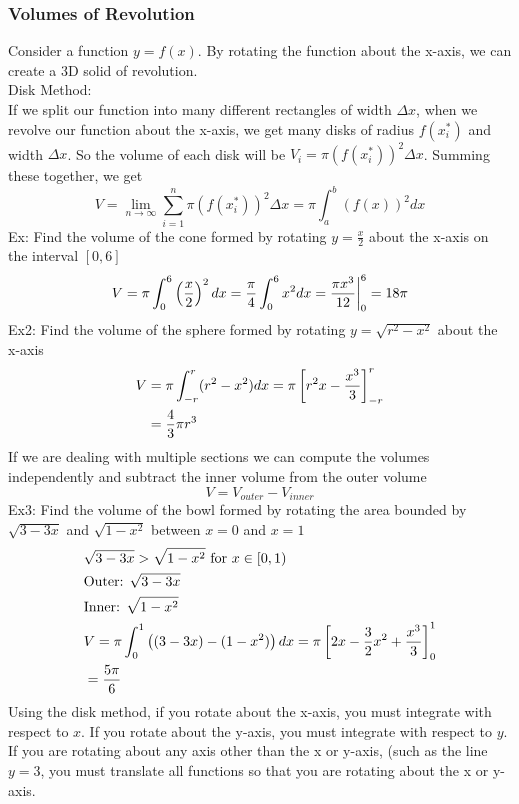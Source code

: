 \documentclass[11pt, fleqn]{article}
\begin{document}
\subsubsection{Volumes of Revolution}
Consider a function $y=f(x)$. By rotating the function about the x-axis, we can create a 3D solid of revolution.\\
Disk Method:\\
If we split our function into many different rectangles of width $\Delta x$, when we revolve our function about the x-axis, we get many disks of radius $f(x_i^*)$ and width $\Delta x$. So the volume of each disk will be $V_i=\pi (f(x_i^*))^2\Delta x$. Summing these together, we get
$$V=\lim_{n\to \infty}\sum_{i=1}^n\pi(f(x_i^*))^2\Delta x=\pi\int_a^b(f(x))^2dx$$
Ex: Find the volume of the cone formed by rotating $y=\frac{x}{2}$ about the x-axis on the interval $[0,6]$
\begin{align*}
    V=\pi\int_0^6\left( \frac{x}{2} \right)^2dx=\frac{\pi}{4}\int_0^6x^2dx={\frac{\pi x^3}{12}}\bigg\vert_0^6=18\pi
\end{align*}
Ex2: Find the volume of the sphere formed by rotating $y=\sqrt{r^2-x^2}$ about the x-axis
\begin{align*}
    V&=\pi\int_{-r}^r(r^2-x^2)dx=\pi\left[ r^2x-\frac{x^3}{3} \right]_{-r}^r\\
    &=\frac{4}{3}\pi r^3
\end{align*}
If we are dealing with multiple sections we can compute the volumes independently and subtract the inner volume from the outer volume
$$V=V_{outer}-V_{inner}$$
Ex3: Find the volume of the bowl formed by rotating the area bounded by $\sqrt{3-3x}$ and $\sqrt{1-x^2}$ between $x=0$ and $x=1$
\begin{align*}
    &\sqrt{3-3x}>\sqrt{1-x^2}\text{ for }x\in[0,1)\\
    &\text{Outer: }\sqrt{3-3x}\\
    &\text{Inner: }\sqrt{1-x^2}\\
    &V=\pi\int_0^1\left( (3-3x)-(1-x^2) \right)dx=\pi\left[ 2x-\frac{3}{2}x^2+\frac{x^3}{3} \right]_0^1\\
    &=\frac{5\pi}{6}
\end{align*}
Using the disk method, if you rotate about the x-axis, you must integrate with respect to $x$. If you rotate about the y-axis, you must integrate with respect to $y$.\\
If you are rotating about any axis other than the x or y-axis, (such as the line $y=3$, you must translate all functions so that you are rotating about the x or y-axis.\\
\end{document}
